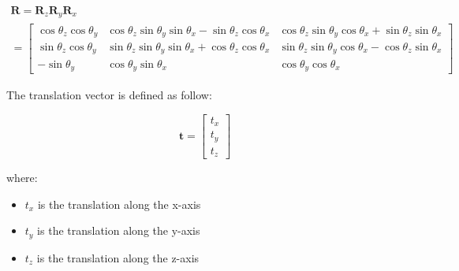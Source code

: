 \begin{gather}
\mathbf{R}=\mathbf{R}_{z} \mathbf{R}_{y}\mathbf{R}_{x}\\
=\left[\begin{array}{ccc}\cos \theta_{z} \cos \theta_{y} & \cos \theta_{z} \sin \theta_{y} \sin \theta_{x}-\sin \theta_{z} \cos \theta_{x} & \cos \theta_{z} \sin \theta_{y} \cos \theta_{x}+\sin \theta_{z} \sin \theta_{x} \\ \sin \theta_{z} \cos \theta_{y} & \sin \theta_{z} \sin \theta_{y} \sin \theta_{x}+\cos \theta_{z} \cos \theta_{x} & \sin \theta_{z} \sin \theta_{y} \cos \theta_{x}-\cos \theta_{z} \sin \theta_{x} \\ -\sin \theta_{y} & \cos \theta_{y} \sin \theta_{x} & \cos \theta_{y} \cos \theta_{x}\end{array}\right]
\end{gather}

The translation vector is defined as follow:

\begin{equation}
\mathbf{t}=\left[\begin{array}{ll}
t_x \\
t_y \\
t_z
\end{array}\right]
\end{equation}

where:
\begin{itemize}
    \item $t_x$ is the translation along the x-axis
    \item $t_y$ is the translation along the y-axis
    \item $t_z$ is the translation along the z-axis
\end{itemize}